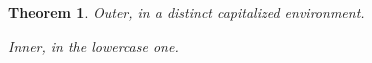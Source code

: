\documentclass{article}
\newtheorem{Theorem}{Theorem}
\begin{document}
\begin{Theorem}\label{thm:outer}
Outer, in a distinct capitalized environment.
\begin{theorem}\label{thm:inner}
Inner, in the lowercase one.
\end{theorem}
\end{Theorem}
\end{document}
